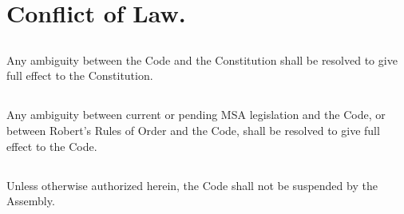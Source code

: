 \section{Conflict of Law.}

\subsection{}
Any ambiguity between the Code and the Constitution shall be resolved to give full effect to the Constitution.  

\subsection{}
Any ambiguity between current or pending MSA legislation and the Code, or between Robert's Rules of Order and the Code, shall be resolved to give full effect to the Code.

\subsection{}
Unless otherwise authorized herein, the Code shall not be suspended by the Assembly.
